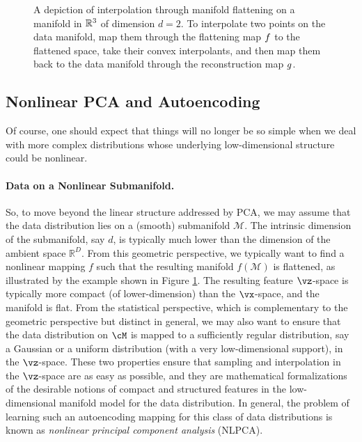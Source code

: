 \documentclass[\toplevelprefix/book-main.tex]{subfiles}
\begin{document}
\begin{figure}
  \caption{A depiction of interpolation through manifold flattening
    on a manifold in \(\mathbb{R}^{3}\) of dimension \(d = 2\). To interpolate
    two points on the data manifold, map them through the flattening
    map \(f\) to the flattened space, take their convex interpolants,
    and then map them back to the data manifold through the
  reconstruction map \(g\).}
  \label{fig:idealized_interpolation}
\end{figure}

\subsection{Nonlinear PCA and Autoencoding}\label{sub:nonlinear-pca}\label{sec:NLPCA}
Of course, one should expect that things will no longer be so simple
when we deal with more complex distributions whose underlying
low-dimensional structure could be nonlinear.

\paragraph{Data on a Nonlinear Submanifold.} So, to move beyond the
linear structure addressed by PCA, we may assume that the data distribution lies on a (smooth) submanifold $\mathcal{M}$. The intrinsic dimension of the submanifold, say $d$, is typically much lower than the
dimension of the ambient space $\mathbb{R}^D$. From this geometric
perspective, we typically want to find a nonlinear mapping $f$ such that
the resulting manifold
$f(\mathcal{M})$ is flattened, as illustrated by the example shown in Figure
\ref{fig:idealized_interpolation}. The resulting feature $\vz$-space
is typically
more compact (of lower-dimension) than the $\vx$-space, and the
manifold is flat.
From the statistical perspective, which is complementary to the geometric
perspective but distinct in general, we may also want to ensure that the data
distribution on $\cM$ is mapped to a sufficiently regular
distribution, say a Gaussian or a uniform distribution (with a 
very low-dimensional support), in the $\vz$-space. These two properties ensure that sampling and interpolation in the $\vz$-space are as easy as possible, and they are mathematical formalizations of the desirable
notions of compact and structured features in the low-dimensional manifold
model for the data distribution.
In general, the problem of learning such an autoencoding mapping for this class
of data distributions is known as {\em nonlinear principal component analysis}
(NLPCA).
\end{document}
